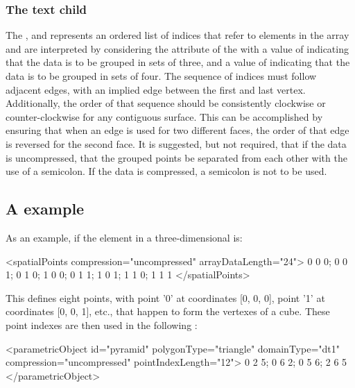 \subsubsection{The \fixttspace{} text child}
The , and represents an ordered list of indices that refer to elements in the \SpatialPoints array and are interpreted by considering the  attribute of the \ParametricObject with a value of  indicating that the data is to be grouped in sets of three, and a value of  indicating that the data is to be grouped in sets of four.  The sequence of indices must follow adjacent edges, with an implied edge between the first and last vertex.  Additionally, the order of that sequence should be consistently clockwise or counter-clockwise for any contiguous surface.  This can be accomplished by ensuring that when an edge is used for two different faces, the order of that edge is reversed for the second face.  It is suggested, but not required, that if the data is uncompressed, that the grouped points be separated from each other with the use of a semicolon.  If the data is compressed, a semicolon is not to be used.

\subsection{A  example}
\label{parametricgeometry-example}

As an example, if the \SpatialPoints element in a three-dimensional \Geometry is:

\begin{example}
    <spatialPoints compression="uncompressed" arrayDataLength="24">
        0 0 0; 0 0 1; 0 1 0; 1 0 0; 0 1 1; 1 0 1; 1 1 0; 1 1 1
    </spatialPoints>
\end{example}

This defines eight points, with point '0' at coordinates [0, 0, 0], point '1' at coordinates [0, 0, 1], etc., that happen to form the vertexes of a cube.  These point indexes are then used in the following \ParametricObject:

\begin{example}
    <parametricObject id="pyramid" polygonType="triangle" domainType="dt1"
                      compression="uncompressed" pointIndexLength="12">
        0 2 5; 0 6 2; 0 5 6; 2 6 5
    </parametricObject>
\end{example}

